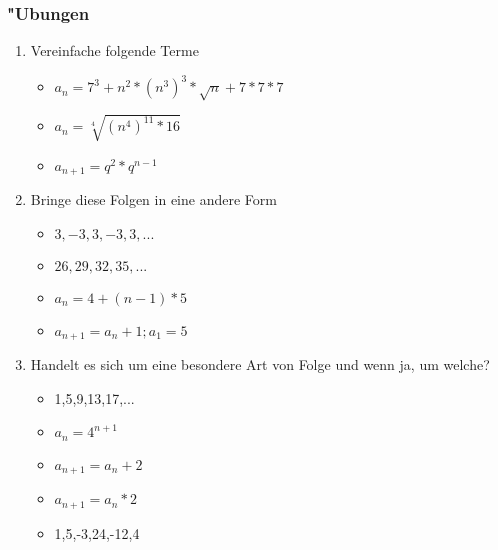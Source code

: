 \subsubsection{"Ubungen}
\begin{enumerate}
\item Vereinfache folgende Terme
\begin{itemize}
\item $ a_n = 7^3 + n^2 * (n^3)^3 * \sqrt{n} + 7*7*7 $
\item $ a_n = \sqrt[4]{(n^4)^{11} * 16} $
\item $ a_{n+1} = q^2 * q^{n-1} $
\end{itemize}
\item Bringe diese Folgen in eine andere Form
\begin{itemize}
\item $3,-3,3,-3,3,...$
\item $26,29,32,35,...$
\item $a_n = 4 + (n-1) * 5$
\item $a_{n+1} = a_n + 1; a_1 = 5$
\end{itemize}
\item Handelt es sich um eine besondere Art von Folge und wenn ja, um welche?\\
\begin{itemize}
\item 1,5,9,13,17,...
\item $a_n = 4^{n+1}$
\item $a_{n+1} = a_n + 2$
\item $a_{n+1} = a_n * 2$
\item 1,5,-3,24,-12,4
\end{itemize}
\end{enumerate}